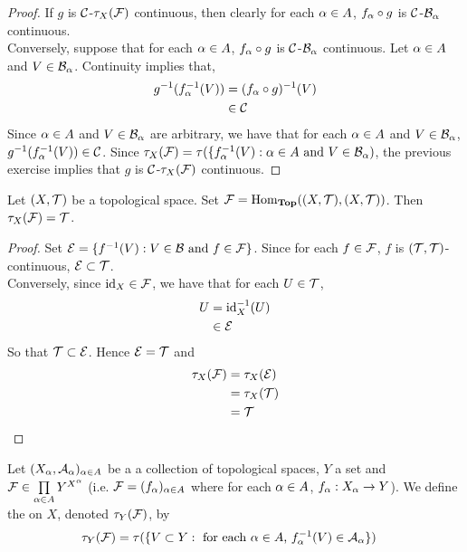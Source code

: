 \documentclass{book}
\begin{document}
	\begin{proof}
		If $g$ is $\mathcal{C}$-$\tau_X(\mathcal{F})$ continuous, then clearly for each $\alpha \in A$, $ f_{\alpha} \circ g$ is $\mathcal{C}$-$\mathcal{B}_{\alpha}$ continuous. \\
		Conversely, suppose that for each $\alpha \in A$, $f_{\alpha} \circ g$ is $\mathcal{C}$-$\mathcal{B}_{\alpha}$ continuous. Let $\alpha \in A$ and $V \in \mathcal{B}_{\alpha}$. Continuity implies that,
		\begin{align*}
			g^{-1}(f_{\alpha}^{-1}(V)) 
			& = (f_{\alpha} \circ g)^{-1}(V) \\
			& \in \mathcal{C}
		\end{align*}
		Since $\alpha \in A$ and $V \in \mathcal{B}_{\alpha}$ are arbitrary, we have that for each $\alpha \in A$ and $V \in \mathcal{B}_{\alpha}$, $g^{-1}(f_{\alpha}^{-1}(V)) \in \mathcal{C}$. Since $\tau_X(\mathcal{F}) = \tau(\{f_{\alpha}^{-1}(V): \alpha \in A \text{ and } V \in \mathcal{B}_{\alpha})$, the previous exercise implies that $g$ is $\mathcal{C}$-$\tau_X(\mathcal{F})$  continuous.
	\end{proof}

	\begin{ex}
		Let $(X, \mathcal{T})$ be a topological space. Set $\mathcal{F} = \operatorname{Hom}_{\operatorname*{\text{\textbf{Top}}}}((X, \mathcal{T}), (X, \mathcal{T}))$. Then $\tau_X(\mathcal{F}) = \mathcal{T}$.
	\end{ex}

	\begin{proof}
		Set $\mathcal{E} = \{f^{-1}(V): V \in \mathcal{B} \text{ and } f \in \mathcal{F} \}$. Since for each $f \in \mathcal{F}$, $f$ is $(\mathcal{T}, \mathcal{T})$-continuous, $\mathcal{E} \subset \mathcal{T}$. \\
		Conversely, since $\operatorname{id}_X \in \mathcal{F}$, we have that for each $U \in \mathcal{T}$, 
		\begin{align*}
			U
			& = \operatorname{id}_X^{-1}(U) \\
			& \in \mathcal{E} 
		\end{align*}
		So that $\mathcal{T} \subset \mathcal{E}$. Hence $\mathcal{E} = \mathcal{T}$ and 
		\begin{align*}
			\tau_X(\mathcal{F})
			& = \tau_X(\mathcal{E}) \\
			& = \tau_X(\mathcal{T}) \\
			& = \mathcal{T}
		\end{align*}
	\end{proof}
	
	\begin{defn} \ld{}
	Let $(X_{\alpha}, \mathcal{A}_{\alpha})_{\alpha \in A}$ be a a collection of topological spaces, $Y$ a set and $\mathcal{F} \in \prod \limits_{\alpha \in A}Y^{X^{\alpha}}$ (i.e. $\mathcal{F} = (f_{\alpha})_{\alpha \in A}$ where for each $\alpha \in A$, $f_{\alpha}:X_{\alpha} \rightarrow Y$). We define the  on $X$, denoted $\tau_Y(\mathcal{F})$, by 
	\begin{align*}
	\tau_Y(\mathcal{F}) 
	&= \tau(\{V \subset Y: \text{ for each $\alpha \in A$, $f_{\alpha}^{-1}(V) \in \mathcal{A}_{\alpha}$}\})
\end{align*}	 
	\end{defn}
	
\end{document}
